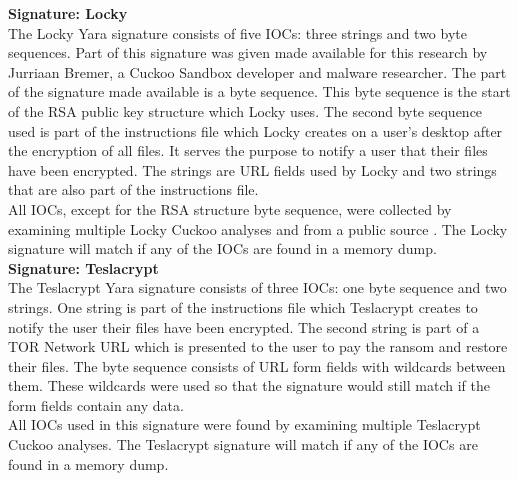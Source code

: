 \documentclass[conference]{IEEEtran}
\begin{document}
\textbf{Signature: Locky}
\\The Locky Yara signature consists of five IOCs: three strings and two byte sequences. Part of this signature was given made available for this research by Jurriaan Bremer, a Cuckoo Sandbox developer and malware researcher. The part of the signature made available is a byte sequence. This byte sequence is the start of the RSA public key structure which Locky uses. The second byte sequence used is part of the instructions file which Locky creates on a user's desktop after the encryption of all files. It serves the purpose to notify a user that their files have been encrypted. The strings are URL fields used by Locky and two strings that are also part of the instructions file.\\All IOCs, except for the RSA structure byte sequence, were collected by examining multiple Locky Cuckoo analyses and from a public source \cite{nelson-locky}. The Locky signature will match if any of the IOCs are found in a memory dump.\\

\textbf{Signature: Teslacrypt}
\\The Teslacrypt Yara signature consists of three IOCs: one byte sequence and two strings. One string is part of the instructions file which Teslacrypt creates to notify the user their files have been encrypted. The second string is part of a TOR Network URL which is presented to the user to pay the ransom and restore their files. The byte sequence consists of URL form fields with wildcards between them. These wildcards were used so that the signature would still match if the form fields contain any data.\\All IOCs used in this signature were found by examining multiple Teslacrypt Cuckoo analyses. The Teslacrypt signature will match if any of the IOCs are found in a memory dump.\\
\end{document}
